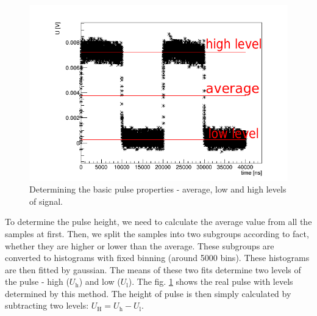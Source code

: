  \begin{figure}[H]
 \centering
 \includegraphics[scale=0.65]{./pictures/PMTPulse}
 \caption{Determining the basic pulse properties - average, low and high levels of signal.}
 \label{pulse}
\end{figure}

To determine the pulse height, we need to calculate the average value from all the samples at first. Then, we split the samples into two subgroups according to fact, whether they are higher or lower than the average. These subgroups are converted to histograms with fixed binning (around 5000 bins). These histograms are then fitted by gaussian. The means of these two fits determine two levels of the pulse - high ($U_\textrm{h}$) and low ($U_\textrm{l}$). The fig. \ref{pulse} shows the real pulse with levels determined by this method. The height of pulse is then simply calculated by subtracting two levels: $U_\textrm{H} = U_\textrm{h} - U_\textrm{l}$.

